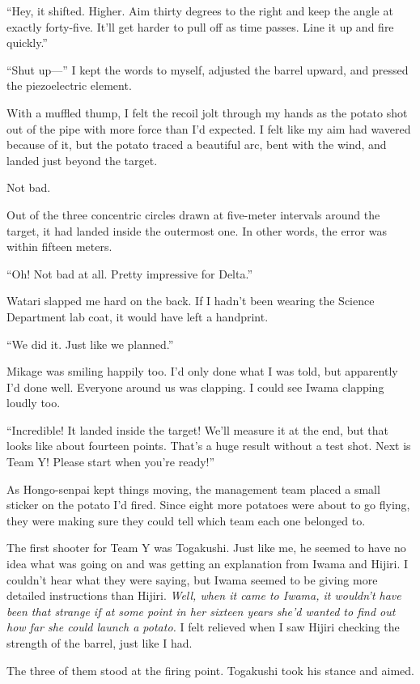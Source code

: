 \documentclass[
    a4paper,
    12pt,
    twoside,
    openany,
    UTF8,
    fontset=windows
]{ctexbook}
\begin{document}
``Hey, it shifted. Higher. Aim thirty degrees to the right and keep the angle at exactly forty-five. It'll get harder to pull off as time passes. Line it up and fire quickly.''

``Shut up---'' I kept the words to myself, adjusted the barrel upward, and pressed the piezoelectric element.

With a muffled thump, I felt the recoil jolt through my hands as the potato shot out of the pipe with more force than I'd expected. I felt like my aim had wavered because of it, but the potato traced a beautiful arc, bent with the wind, and landed just beyond the target.

Not bad.

Out of the three concentric circles drawn at five-meter intervals around the target, it had landed inside the outermost one. In other words, the error was within fifteen meters.

``Oh! Not bad at all. Pretty impressive for Delta.''

Watari slapped me hard on the back. If I hadn't been wearing the Science Department lab coat, it would have left a handprint.

``We did it. Just like we planned.''

Mikage was smiling happily too. I'd only done what I was told, but apparently I'd done well. Everyone around us was clapping. I could see Iwama clapping loudly too.

``Incredible! It landed inside the target! We'll measure it at the end, but that looks like about fourteen points. That's a huge result without a test shot. Next is Team Y! Please start when you're ready!''

As Hongo-senpai kept things moving, the management team placed a small sticker on the potato I'd fired. Since eight more potatoes were about to go flying, they were making sure they could tell which team each one belonged to.

The first shooter for Team Y was Togakushi. Just like me, he seemed to have no idea what was going on and was getting an explanation from Iwama and Hijiri. I couldn't hear what they were saying, but Iwama seemed to be giving more detailed instructions than Hijiri. \textit{Well, when it came to Iwama, it wouldn't have been that strange if at some point in her sixteen years she'd wanted to find out how far she could launch a potato.} I felt relieved when I saw Hijiri checking the strength of the barrel, just like I had.

The three of them stood at the firing point. Togakushi took his stance and aimed.
\end{document}
